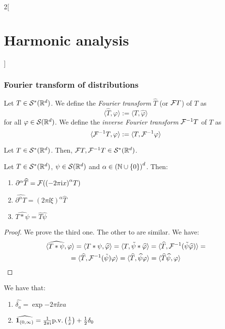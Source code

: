 \documentclass[../../../main_math.tex]{subfiles}
\begin{document}
\begin{multicols}{2}[\section{Harmonic analysis}]
  \subsubsection{Fourier transform of distributions}
  \begin{definition}
    Let $T\in \mathcal{S}^*(\mathbb{R}^d)$. We define the \emph{Fourier transform} $\widehat{T}$ (or $\mathcal{F}{T}$) of $T$ as
    $$
      \langle \widehat{T},\varphi\rangle:=\langle T,\widehat{\varphi}\rangle
    $$
    for all $\varphi\in \mathcal{S}(\mathbb{R}^d)$. We define the \emph{inverse Fourier transform} $\mathcal{F}^{-1}{T}$ of $T$ as
    $$
      \langle \mathcal{F}^{-1}{T},\varphi\rangle:=\langle T,\mathcal{F}^{-1}{\varphi}\rangle
    $$
  \end{definition}
  \begin{lemma}
    Let $T\in \mathcal{S}^*(\mathbb{R}^d)$. Then, $\mathcal{F}{T},\mathcal{F}^{-1}T\in \mathcal{S}^*(\mathbb{R}^d)$.
  \end{lemma}
  \begin{proposition}
    Let $T\in \mathcal{S}^*(\mathbb{R}^d)$, $\psi \in \mathcal{S}(\mathbb{R}^d)$ and $\alpha\in{(\ensuremath{\mathbb{N}}\cup\{0\})}^d$. Then:
    \begin{enumerate}
      \item $\partial^\alpha\widehat{T}=\mathcal{F}({{(-2\pi\mathrm{i} x)}^{\alpha} T})$
      \item $\widehat{\partial^\alpha T}={(2\pi\ii \xi)}^{\alpha}\widehat{T}$
      \item $\widehat{T*\psi}=\widehat{T}\widehat{\psi}$
    \end{enumerate}
  \end{proposition}
  \begin{proof}
    We prove the third one. The other to are similar. We have:
    \begin{multline*}
      \langle \widehat{T*\psi},\varphi\rangle=\langle T*\psi,\widehat{\varphi}\rangle=\langle T,\tilde\psi*\widehat{\varphi}\rangle=\langle \widehat{T},\mathcal{F}^{-1}(\tilde{\psi}\widehat{\varphi})\rangle=\\
      =\langle \widehat{T},\mathcal{F}^{-1}(\tilde{\psi})\varphi\rangle=\langle \widehat{T},\widehat{\psi}\varphi\rangle=\langle \widehat{T}\widehat{\psi},\varphi\rangle
    \end{multline*}
  \end{proof}
  \begin{lemma}\label{HA:lemma_propdelta}
    We have that:
    \begin{enumerate}
      \item $\widehat{\delta_a}=\exp{-2\pi\ii xa}$
      \item $\widehat{\boldsymbol{\mathrm{1}}_{(0,\infty)}}=\frac{1}{2\pi\mathrm{i}}\mathrm{p.v.}\left(\frac{1}{x}\right)+\frac{1}{2}\delta_0$

\end{enumerate}
\end{lemma}
\end{multicols}
\end{document}
